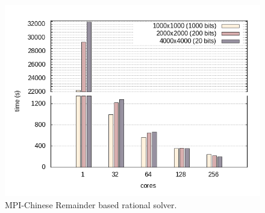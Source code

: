 \begin{figure}[htb]
\begin{center}
  \includegraphics[width=.8\textwidth]{nodes_histogram}
\end{center}
\caption{MPI-Chinese Remainder based rational solver.}\label{fig:mpi_histo}
\end{figure}

